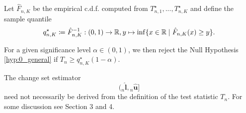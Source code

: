 Let $\hat{F}_{n, K}$ be the empirical c.d.f. computed from $T_{n, 1}^\star, ..., T_{n, K}^\star$ and define the sample quantile 
\begin{equation} \label{defn:sample quantile}
    q_{n, K}^\star \coloneqq \hat{F}_{n, K}^{-1}: (0, 1) \to \mathbb{R}, y \mapsto \inf \{x \in \mathbb{R} \mid \hat{F}_{n, K}(x) \geq y\}. 
\end{equation}

For a given significance level $\alpha \in (0, 1)$, we then reject the Null Hypothesis \ref{hyp:0_general} if $T_n \geq q_{n, K}^\star(1-\alpha)$.

\begin{remark}
    The change set estimator
    \[ ({}_{n}\hat{\mathbf{l}}, {}_{n}\hat{\mathbf{u}}] \]
    need not necessarily be derived from the definition of the test statistic $T_n$. For some discussion see \cite{[8]BUCCHIA2015104} Section 3 and 4.
\end{remark}
